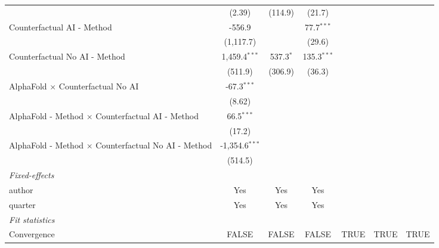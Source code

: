 \begin{tabular}{lcccccc}
                                                              & (2.39)           & (114.9)     & (21.7)         &      &      &   \\   
   Counterfactual AI - Method                                 & -556.9           &             & 77.7$^{***}$   &      &      &   \\   
                                                              & (1,117.7)        &             & (29.6)         &      &      &   \\   
   Counterfactual No AI - Method                              & 1,459.4$^{***}$  & 537.3$^{*}$ & 135.3$^{***}$  &      &      &   \\   
                                                              & (511.9)          & (306.9)     & (36.3)         &      &      &   \\   
   AlphaFold $\times$ Counterfactual No AI                    & -67.3$^{***}$    &             &                &      &      &   \\   
                                                              & (8.62)           &             &                &      &      &   \\   
   AlphaFold - Method $\times$ Counterfactual AI - Method     & 66.5$^{***}$     &             &                &      &      &   \\   
                                                              & (17.2)           &             &                &      &      &   \\   
   AlphaFold - Method $\times$ Counterfactual No AI - Method  & -1,354.6$^{***}$ &             &                &      &      &   \\   
                                                              & (514.5)          &             &                &      &      &   \\   
   \midrule
   \emph{Fixed-effects}\\
   author                                                     & Yes              & Yes         & Yes            &      &      & \\  
   quarter                                                    & Yes              & Yes         & Yes            &      &      & \\  
   \midrule
   \emph{Fit statistics}\\
   Convergence                                                &FALSE             & FALSE       & FALSE          & TRUE & TRUE & TRUE\\  

\end{tabular}
